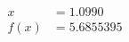 \documentclass[preview]{standalone}
\begin{document}
\begin{align*}
x &= 1.0990\\f(x) &= 5.6855395
\end{align*}
\end{document}
